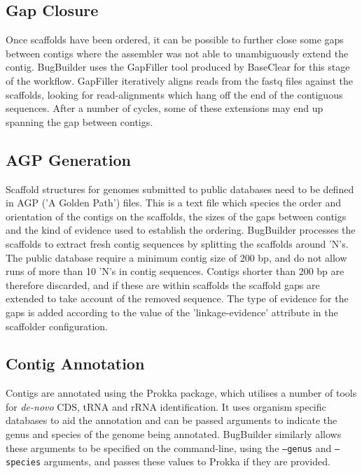 \documentclass[a4paper,10pt]{article}
\begin{document}
\subsection{Gap Closure}

Once scaffolds have been ordered, it can be possible to further close some gaps between contigs
where the assembler was not able to unambiguously extend the contig. BugBuilder uses the GapFiller
tool produced by BaseClear for this stage of the workflow. GapFiller iteratively aligns reads from
the fastq files against the scaffolds, looking for read-alignments which hang off the end
of the contiguous sequences. After a number of cycles, some of these extensions may end up
spanning the gap between contigs.

\subsection{AGP Generation}

Scaffold structures for genomes submitted to public databases need to be defined in AGP ('A Golden
Path') files. This is a text file which species the order and orientation of the contigs on the
scaffolds, the sizes of the gaps between contigs and the kind of evidence used to establish the
ordering.  BugBuilder processes the scaffolds to extract fresh contig sequences by splitting the
scaffolds around 'N's. The public database require a minimum contig size of 200 bp, and do not
allow runs of more than 10 'N's in contig sequences. Contigs shorter than 200 bp are therefore
discarded, and if these are within scaffolds the scaffold gaps are extended to take account of the
removed sequence.  The type of evidence for the gaps is added according to the value of the
'linkage-evidence' attribute in the  scaffolder configuration.

\subsection{Contig Annotation}

Contigs are annotated using the Prokka package, which utilises a number of tools for
\textit{de-novo} CDS, tRNA and rRNA  identification. It uses organism specific databases to aid
the annotation and can be passed arguments to indicate the genus and species of the genome being
annotated. BugBuilder similarly allows these arguments to be specified on the command-line, using
the {\tt --genus} and {\tt --species} arguments, and passes these values to Prokka if they are provided. 
\end{document}
